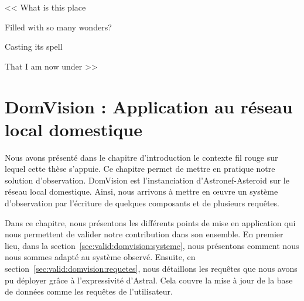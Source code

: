 \begin{savequote}[6cm]
<< What is this place

Filled with so many wonders?

Casting its spell

That I am now under >>

\end{savequote}

\chapter{DomVision : Application au réseau local domestique}\label{chap:valid:domvision}
\chaptertoc
Nous avons présenté dans le chapitre d'introduction le contexte fil rouge sur lequel cette thèse s'appuie. Ce chapitre permet de mettre en pratique notre solution d'observation. DomVision est l'instanciation d'Astronef-Asteroid sur le réseau local domestique. Ainsi, nous arrivons à mettre en œuvre un système d'observation par l'écriture de quelques composants et de plusieurs requêtes.

Dans ce chapitre, nous présentons les différents points de mise en application qui nous permettent de valider notre contribution dans son ensemble. En premier lieu, dans la section~\ref{sec:valid:domvision:systeme}, nous présentons comment nous nous sommes adapté au système observé. Ensuite, en section~\ref{sec:valid:domvision:requetes}, nous détaillons les requêtes que nous avons pu déployer grâce à l'expressivité d'Astral. Cela couvre la mise à jour de la base de données comme les requêtes de l'utilisateur.





